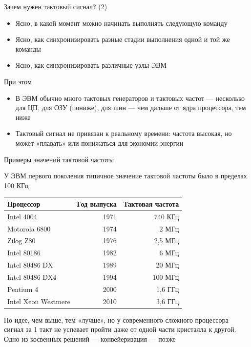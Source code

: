 \documentclass[xetex,aspectratio=43]{beamer}
\begin{document}
\begin{frame}{Зачем нужен тактовый сигнал? (2)}
    \begin{itemize}
        \tightlist
        \item
        Ясно, в какой момент можно начинать выполнять следующую команду
        \item
        Ясно, как синхронизировать разные стадии выполнения одной и той же
        команды
        \item
        Ясно, как синхронизировать различные узлы ЭВМ
    \end{itemize}

    При этом

    \begin{itemize}
        \tightlist
        \item
        В ЭВМ обычно много тактовых генераторов и тактовых частот ---
        несколько для ЦП, для ОЗУ (пониже), для шин --- чем дальше
        от ядра процессора, тем ниже
        \item
        Тактовый сигнал не привязан к реальному времени: частота высокая, но
        может «плавать» или понижаться для экономии энергии
    \end{itemize}
\end{frame}

\begin{frame}{Примеры значений тактовой частоты}

        У ЭВМ первого поколения типичное значение тактовой частоты было в
        пределах 100 КГц

        \begin{center}
            \begin{tabular}[]{lrr}
                \hline
                Процессор & Год выпуска & Тактовая частота \\
                \hline
                Intel 4004 & 1971 & 740 КГц \\
                Motorola 6800 & 1974 & 2 МГц \\
                Zilog Z80 & 1976 & 2,5 МГц \\
                Intel 80186 & 1982 & 6 МГц \\
                Intel 80486 DX & 1989 & 20 МГц \\
                Intel 80486 DX4 & 1994 & 100 МГц \\
                Pentium 4 & 2000 & 1,6 ГГц \\
                Intel Xeon Westmere & 2010 & 3,6 ГГц \\
                \hline
            \end{tabular}
        \end{center}

        \pause

        По идее, чем выше, тем «лучше», но у современного сложного процессора
        сигнал за 1 такт не успевает пройти даже от одной части кристалла к другой. Одно из
        косвенных решений --- конвейеризация --- позже
\end{frame}
\end{document}

